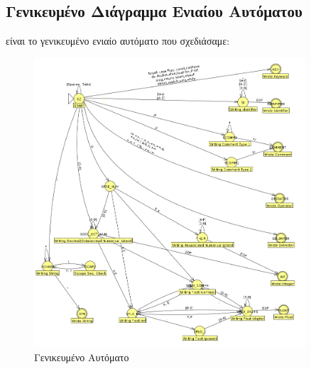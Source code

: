 \documentclass[14pt]{extarticle}
\begin{document}
\subsection{Γενικευμένο Διάγραμμα Ενιαίου Αυτόματου}
 είναι το γενικευμένο ενιαίο αυτόματο που σχεδιάσαμε:
\begin{figure}[h!]
  \caption{Γενικευμένο Αυτόματο}
  \includegraphics[width=0.9\textwidth]{automata_general}
\end{figure}
\clearpage
\end{document}
